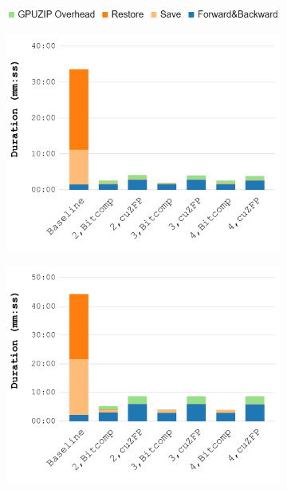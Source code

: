 \documentclass[Ingles]{ic-tese-v3}
\begin{document}
\begin{figure}[h!]
    \centering

    \begin{subfigure}{0.5\textwidth}
        \includegraphics[width=\textwidth]{figures/gpuzip_breakdown/Figure7_legend.png}
        \label{fig:breakdown_legend}
    \end{subfigure}
    \par  %

    \begin{subfigure}{0.48\textwidth}
        \includegraphics[width=\textwidth]{figures/gpuzip_breakdown/Figure7_a.pdf}
        \caption{\revolve}
        \label{fig:breakdown_revolve}
    \end{subfigure}%
    \hfill
    \begin{subfigure}{0.48\textwidth}
        \includegraphics[width=\textwidth]{figures/gpuzip_breakdown/Figure7_b.pdf}
        \caption{\zcut}
        \label{fig:breakdown_zcut}
    \end{subfigure}
    \par\medskip  %


\end{figure}
\end{document}
